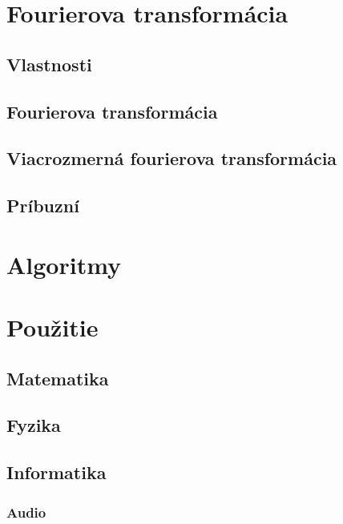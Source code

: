 



\chapter{Fourierova transformácia}
    
    
    
\section{Vlastnosti}
\section{Fourierova transformácia}
\section{Viacrozmerná fourierova transformácia}
\section{Príbuzní}

\chapter{Algoritmy}
    
    
    
    
    
    
    
    
    
    

\chapter{Použitie}
\section{Matematika}
    
    
    
    
    
         
\section{Fyzika}
    
    
    
    
    
\section{Informatika}
    
    
    
    
    
    \subsection{Audio}
     
    
